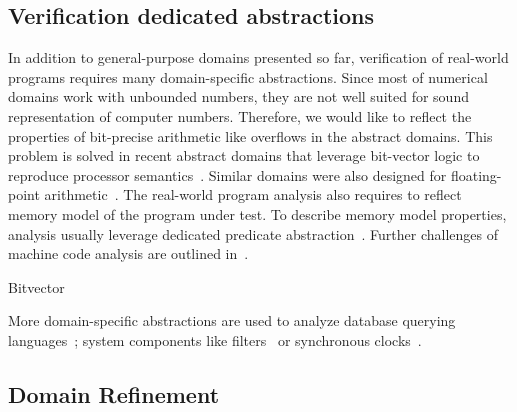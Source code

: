 \subsection{Verification dedicated abstractions}

In addition to general-purpose domains presented so far, verification of
real-world programs requires many domain-specific abstractions. Since most of
numerical domains work with unbounded numbers, they are not well suited for
sound representation of computer numbers. Therefore, we would like to reflect
the properties of bit-precise arithmetic like overflows in the abstract
domains.  This problem is solved in recent abstract domains that leverage
bit-vector logic to reproduce processor semantics~\cite{Sharma2013,
Sharma2017}. Similar domains were also designed for floating-point
arithmetic~\cite{Putot2004}.  The real-world program analysis also requires to
reflect memory model of the program under test. To describe memory model
properties, analysis usually leverage dedicated predicate
abstraction~\cite{Dan2013}. Further challenges of machine code analysis are
outlined in~\cite{Reps2010}.

\begin{marginfigure}

\caption{Bitvector}
\label{fig:bitvector}
\end{marginfigure}

More domain-specific abstractions are used to analyze database querying languages~\cite{Halder2012}; system components like filters~\cite{Feret2004} or syn\-chro\-nous clocks~\cite{Feret2005}.

\subsection{Domain Refinement}
\label{sec:domainrefinement}

